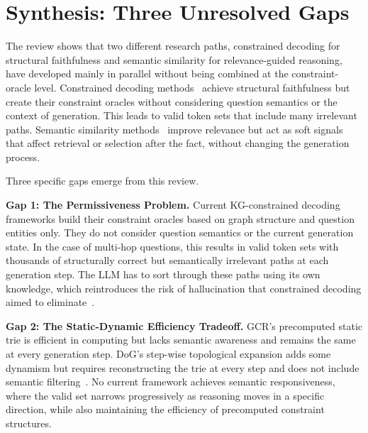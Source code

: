 \section{Synthesis: Three Unresolved Gaps}
\label{sec:synthesis}

The review shows that two different research paths, constrained decoding for structural faithfulness and semantic similarity for relevance-guided reasoning, have developed mainly in parallel without being combined at the constraint-oracle level. Constrained decoding methods~\citep{luo2025-graph-constrained-reasoning, li2024-decoding-on-graphs} achieve structural faithfulness but create their constraint oracles without considering question semantics or the context of generation. This leads to valid token sets that include many irrelevant paths. Semantic similarity methods~\citep{shi2021kgpath, saxena2022kgqa, yuan2026routerkgqa} improve relevance but act as soft signals that affect retrieval or selection after the fact, without changing the generation process.

Three specific gaps emerge from this review.

\textbf{Gap 1: The Permissiveness Problem.} Current KG-constrained decoding frameworks build their constraint oracles based on graph structure and question entities only. They do not consider question semantics or the current generation state. In the case of multi-hop questions, this results in valid token sets with thousands of structurally correct but semantically irrelevant paths at each generation step. The LLM has to sort through these paths using its own knowledge, which reintroduces the risk of hallucination that constrained decoding aimed to eliminate~\citep{luo2025-graph-constrained-reasoning, li2024-decoding-on-graphs}.

\textbf{Gap 2: The Static-Dynamic Efficiency Tradeoff.} GCR's precomputed static trie is efficient in computing but lacks semantic awareness and remains the same at every generation step. DoG's step-wise topological expansion adds some dynamism but requires reconstructing the trie at every step and does not include semantic filtering~\citep{li2024-decoding-on-graphs, willard2023outlines}. No current framework achieves semantic responsiveness, where the valid set narrows progressively as reasoning moves in a specific direction, while also maintaining the efficiency of precomputed constraint structures.

